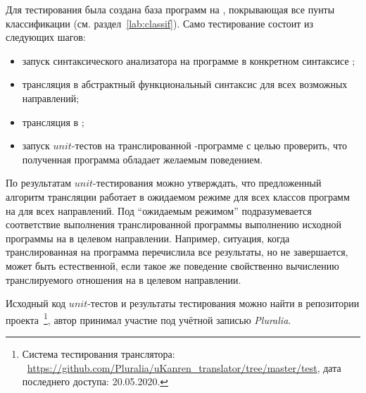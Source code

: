 Для тестирования была создана база программ на \miniKanren{}, покрывающая все пунты классификации (см. раздел~\ref{lab:classif}).
Само тестирование состоит из следующих шагов:
\begin{itemize}
    \item запуск синтаксического анализатора на программе в конкретном синтаксисе \miniKanren{};
    \item трансляция в абстрактный функциональный синтаксис для всех возможных направлений;
    \item трансляция в \haskell{};
    \item запуск $unit$-тестов на транслированной \haskell{}-программе с целью проверить, что полученная программа обладает желаемым поведением.
\end{itemize}

По результатам $unit$-тестирования можно утверждать, что предложенный алгоритм трансляции работает в ожидаемом режиме для всех классов программ на \miniKanren{} для всех направлений.
Под ``ожидаемым режимом'' подразумевается соответствие выполнения транслированной программы выполнению исходной программы на \miniKanren{} в целевом направлении.
Например, ситуация, когда транслированная на \haskell{} программа перечислила все результаты, но не завершается, может быть естественной, если такое же поведение свойственно вычислению транслируемого отношения на \miniKanren{} в целевом направлении.

Исходный код $unit$-тестов и результаты тестирования можно найти в репозитории проекта~\footnote{Система тестирования транслятора: ~\url{https://github.com/Pluralia/uKanren_translator/tree/master/test}, дата последнего доступа: 20.05.2020.}, автор принимал участие под учётной записью \emph{Pluralia}.